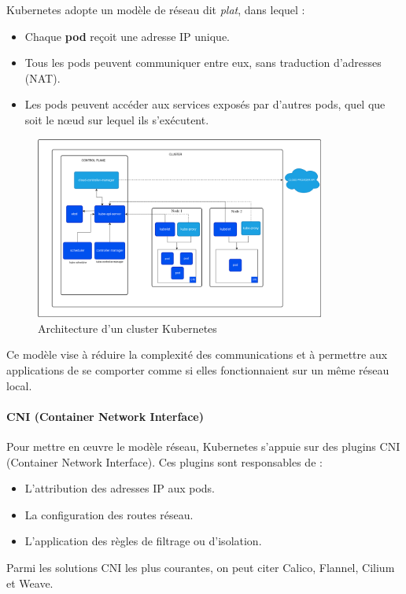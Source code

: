 Kubernetes adopte un modèle de réseau dit \emph{plat}, dans lequel :
\begin{itemize}
	\item Chaque \textbf{pod} reçoit une adresse IP unique.
	\item Tous les pods peuvent communiquer entre eux, sans traduction d’adresses (NAT).
	\item Les pods peuvent accéder aux services exposés par d’autres pods, quel que soit le nœud sur lequel ils s’exécutent.
\end{itemize}
\begin{figure}[H]
	\centering
	\includegraphics[width=0.85\textwidth]{figures/kubernetes-cluster-architecture.png}
	\caption{Architecture d'un cluster Kubernetes}
\end{figure}
Ce modèle vise à réduire la complexité des communications et à permettre aux applications de se comporter comme si elles fonctionnaient sur un même réseau local.

\paragraph{CNI (Container Network Interface)}

Pour mettre en œuvre le modèle réseau, Kubernetes s’appuie sur des plugins CNI (Container Network Interface).
Ces plugins sont responsables de :
\begin{itemize}
	\item L’attribution des adresses IP aux pods.
	\item La configuration des routes réseau.
	\item L’application des règles de filtrage ou d’isolation.
\end{itemize}
Parmi les solutions CNI les plus courantes, on peut citer Calico, Flannel, Cilium et Weave.

